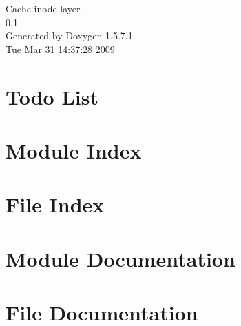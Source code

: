 \documentclass[a4paper]{book}
\begin{document}
\begin{titlepage}
\vspace*{7cm}
\begin{center}
{\Large Cache inode layer \\[1ex]\large 0.1 }\\
\vspace*{1cm}
{\large Generated by Doxygen 1.5.7.1}\\
\vspace*{0.5cm}
{\small Tue Mar 31 14:37:28 2009}\\
\end{center}
\end{titlepage}
\clearemptydoublepage
{}
\tableofcontents
\clearemptydoublepage
{}
\chapter{Todo List}
\label{todo}

\chapter{Module Index}

\chapter{File Index}

\chapter{Module Documentation}


\chapter{File Documentation}































\printindex
\end{document}
